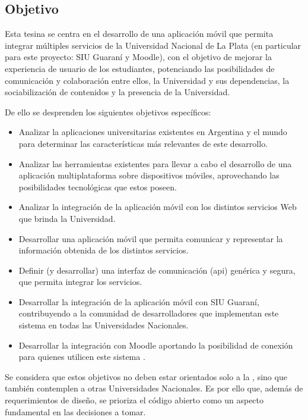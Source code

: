 \subsection{Objetivo}
\label{objetivo}

Esta tesina se centra en el desarrollo de una aplicación móvil que permita
integrar múltiples servicios de la Universidad Nacional de La Plata (en
particular para este proyecto: SIU Guaraní y Moodle), con el objetivo de mejorar
la experiencia de usuario de los estudiantes, potenciando las posibilidades de
comunicación y colaboración entre ellos, la Universidad y sus dependencias, la
sociabilización de contenidos y la presencia de la Universidad.

De ello se desprenden los siguientes objetivos específicos:

\begin{itemize}
  \item Analizar la aplicaciones universitarias existentes en Argentina y el mundo para determinar las características más relevantes de este desarrollo.

  \item Analizar las herramientas existentes para llevar a cabo el desarrollo
  de una aplicación multiplataforma sobre dispositivos móviles, aprovechando las
  posibilidades tecnológicas que estos poseen.

  \item Analizar la integración de la aplicación móvil con los distintos
  servicios Web que brinda la Universidad.

  \item Desarrollar una aplicación móvil que permita comunicar y representar la
  información obtenida de los distintos servicios.

  \item Definir (y desarrollar) una interfaz de comunicación (\gls{api}) genérica y segura, que permita integrar los servicios.

  \item Desarrollar la integración de la aplicación móvil con SIU Guaraní,
  contribuyendo a la comunidad de desarrolladores que implementan este sistema en todas las Universidades Nacionales.

  \item Desarrollar la integración con Moodle aportando la posibilidad de
  conexión para quienes utilicen este sistema .
\end{itemize}

Se considera que estos objetivos no deben estar orientados solo a la \unlp{}, sino que también contemplen a otras Universidades Nacionales. Es por ello que, además de requerimientos de diseño, se prioriza el código abierto como un aspecto fundamental en las decisiones a tomar.

